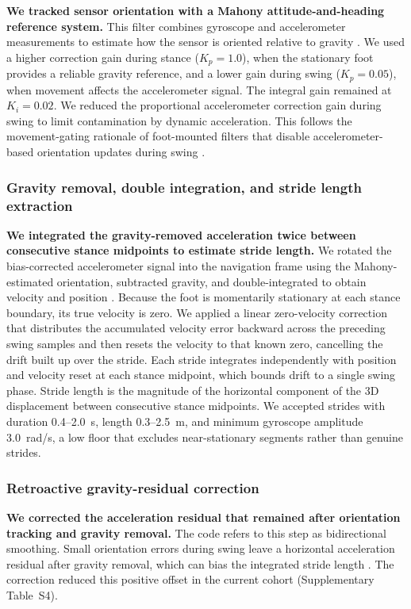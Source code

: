 \documentclass[fleqn,10pt,lineno]{wlpeerj}
\begin{document}
\textbf{We tracked sensor orientation with a Mahony attitude-and-heading reference system.} This filter combines gyroscope and accelerometer measurements to estimate how the sensor is oriented relative to gravity \citep{Mahony2008}. We used a higher correction gain during stance ($K_p = 1.0$), when the stationary foot provides a reliable gravity reference, and a lower gain during swing ($K_p = 0.05$), when movement affects the accelerometer signal. The integral gain remained at $K_i = 0.02$. We reduced the proportional accelerometer correction gain during swing to limit contamination by dynamic acceleration. This follows the movement-gating rationale of foot-mounted filters that disable accelerometer-based orientation updates during swing \citep{Hannink2017}.

\subsubsection{Gravity removal, double integration, and stride length extraction}

\textbf{We integrated the gravity-removed acceleration twice between consecutive stance midpoints to estimate stride length.} We rotated the bias-corrected accelerometer signal into the navigation frame using the Mahony-estimated orientation, subtracted gravity, and double-integrated to obtain velocity and position \citep{Foxlin2005}. Because the foot is momentarily stationary at each stance boundary, its true velocity is zero. We applied a linear zero-velocity correction that distributes the accumulated velocity error backward across the preceding swing samples and then resets the velocity to that known zero, cancelling the drift built up over the stride. Each stride integrates independently with position and velocity reset at each stance midpoint, which bounds drift to a single swing phase. Stride length is the magnitude of the horizontal component of the 3D displacement between consecutive stance midpoints. We accepted strides with duration 0.4--2.0~s, length 0.3--2.5~m, and minimum gyroscope amplitude 3.0~rad/s, a low floor that excludes near-stationary segments rather than genuine strides.

\subsubsection{Retroactive gravity-residual correction}

\textbf{We corrected the acceleration residual that remained after orientation tracking and gravity removal.} The code refers to this step as bidirectional smoothing. Small orientation errors during swing leave a horizontal acceleration residual after gravity removal, which can bias the integrated stride length \citep{Foxlin2005, Hannink2017}. The correction reduced this positive offset in the current cohort (Supplementary Table~S4).
\end{document}
